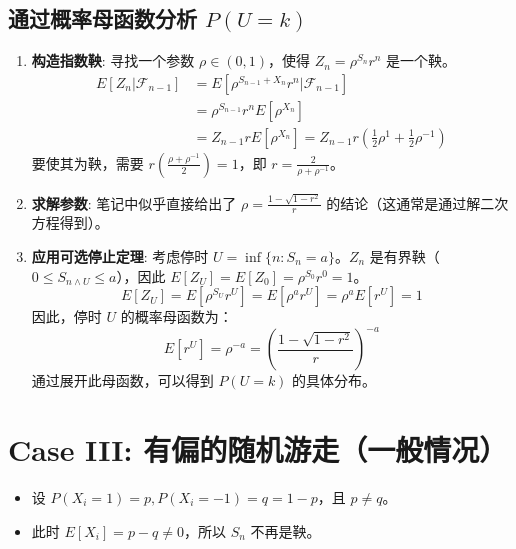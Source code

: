 \documentclass[12pt, a4paper, oneside, fontset=windows]{ctexbook}
\begin{document}
\subsection{通过概率母函数分析 $P(U=k)$}
\begin{enumerate}
    \item \textbf{构造指数鞅}: 寻找一个参数 $\rho \in (0,1)$，使得 $Z_n = \rho^{S_n} r^n$ 是一个鞅。
    \begin{align*}
        E[Z_n|\mathcal{F}_{n-1}] &= E[\rho^{S_{n-1}+X_n} r^n | \mathcal{F}_{n-1}] \\
        &= \rho^{S_{n-1}} r^n E[\rho^{X_n}] \\
        &= Z_{n-1} r E[\rho^{X_n}] = Z_{n-1} r \left( \frac{1}{2}\rho^1 + \frac{1}{2}\rho^{-1} \right)
    \end{align*}
    要使其为鞅，需要 $r \left( \frac{\rho+\rho^{-1}}{2} \right) = 1$，即 $r = \frac{2}{\rho+\rho^{-1}}$。
    
    \item \textbf{求解参数}: 笔记中似乎直接给出了 $\rho = \frac{1-\sqrt{1-r^2}}{r}$ 的结论（这通常是通过解二次方程得到）。
    
    \item \textbf{应用可选停止定理}: 考虑停时 $U = \inf\{n: S_n=a\}$。$Z_n$ 是有界鞅（$0 \le S_{n \wedge U} \le a$），因此 $E[Z_U] = E[Z_0] = \rho^{S_0} r^0 = 1$。
    \[ E[Z_U] = E[\rho^{S_U} r^U] = E[\rho^a r^U] = \rho^a E[r^U] = 1 \]
    因此，停时 $U$ 的概率母函数为：
    \[ E[r^U] = \rho^{-a} = \left( \frac{1-\sqrt{1-r^2}}{r} \right)^{-a} \]
    通过展开此母函数，可以得到 $P(U=k)$ 的具体分布。
\end{enumerate}

\section{Case III: 有偏的随机游走（一般情况）}
\begin{itemize}
    \item 设 $P(X_i=1)=p, P(X_i=-1)=q=1-p$，且 $p \neq q$。
    \item 此时 $E[X_i] = p-q \neq 0$，所以 $S_n$ 不再是鞅。
\end{itemize}
\end{document}
